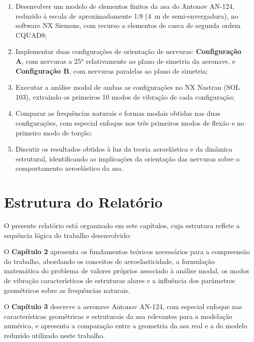 \documentclass[11pt,oneside,a4paper,final]{report}
\begin{document}
\begin{enumerate}
    \item Desenvolver um modelo de elementos finitos da asa do Antonov AN-124, reduzido à escala de aproximadamente 1:9 (\SI{4}{\meter} de semi-envergadura), no software NX Siemens, com recurso a elementos de casca de segunda ordem CQUAD8;

    \item Implementar duas configurações de orientação de nervuras: \textbf{Configuração A}, com nervuras a 25° relativamente ao plano de simetria da aeronave, e \textbf{Configuração B}, com nervuras paralelas ao plano de simetria;

    \item Executar a análise modal de ambas as configurações no NX Nastran (SOL 103), extraindo os primeiros 10 modos de vibração de cada configuração;

    \item Comparar as frequências naturais e formas modais obtidas nas duas configurações, com especial enfoque nos três primeiros modos de flexão e no primeiro modo de torção;

    \item Discutir os resultados obtidos à luz da teoria aeroelástica e da dinâmica estrutural, identificando as implicações da orientação das nervuras sobre o comportamento aeroelástico da asa.
\end{enumerate}

\section{Estrutura do Relatório}

O presente relatório está organizado em sete capítulos, cuja estrutura reflete a sequência lógica do trabalho desenvolvido:

O \textbf{Capítulo 2} apresenta os fundamentos teóricos necessários para a compreensão do trabalho, abordando os conceitos de aeroelasticidade, a formulação matemática do problema de valores próprios associado à análise modal, os modos de vibração característicos de estruturas alares e a influência dos parâmetros geométricos sobre as frequências naturais.

O \textbf{Capítulo 3} descreve a aeronave Antonov AN-124, com especial enfoque nas características geométricas e estruturais da asa relevantes para a modelação numérica, e apresenta a comparação entre a geometria da asa real e a do modelo reduzido utilizado neste trabalho.
\end{document}
